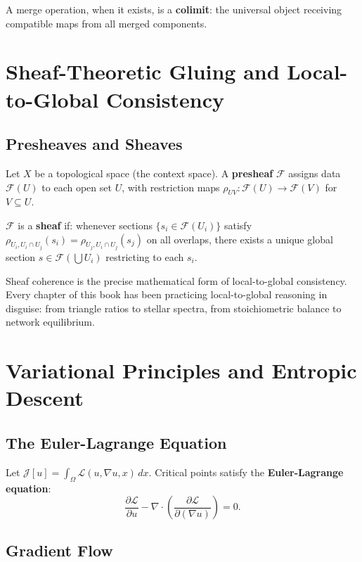 \documentclass[11pt, openany]{book}
\theoremstyle{plain}
\theoremstyle{definition}
\theoremstyle{remark}
\newcommand{\pd}[2]{\frac{\partial #1}{\partial #2}}
\begin{document}
A merge operation, when it exists, is a \textbf{colimit}: the universal
object receiving compatible maps from all merged components.

\chapter{Sheaf-Theoretic Gluing and Local-to-Global Consistency}

\section{Presheaves and Sheaves}

Let $X$ be a topological space (the context space). A \textbf{presheaf}
$\mathcal{F}$ assigns data $\mathcal{F}(U)$ to each open set $U$, with
restriction maps $\rho_{UV}:\mathcal{F}(U)\to\mathcal{F}(V)$ for $V\subseteq U$.

$\mathcal{F}$ is a \textbf{sheaf} if: whenever sections
$\{s_i\in\mathcal{F}(U_i)\}$ satisfy $\rho_{U_i,U_i\cap U_j}(s_i)=\rho_{U_j,U_i\cap U_j}(s_j)$
on all overlaps, there exists a unique global section $s\in\mathcal{F}(\bigcup U_i)$
restricting to each $s_i$.

\begin{principle}
Sheaf coherence is the precise mathematical form of local-to-global
consistency. Every chapter of this book has been practicing local-to-global
reasoning in disguise: from triangle ratios to stellar spectra, from
stoichiometric balance to network equilibrium.
\end{principle}

\chapter{Variational Principles and Entropic Descent}

\section{The Euler-Lagrange Equation}

Let $\mathcal{J}[u]=\int_\Omega\mathcal{L}(u,\nabla u,x)\,dx$. Critical
points satisfy the \textbf{Euler-Lagrange equation}:
\[
  \pd{\mathcal{L}}{u}-\nabla\cdot\left(\pd{\mathcal{L}}{(\nabla u)}\right)=0.
\]

\section{Gradient Flow}
\end{document}
